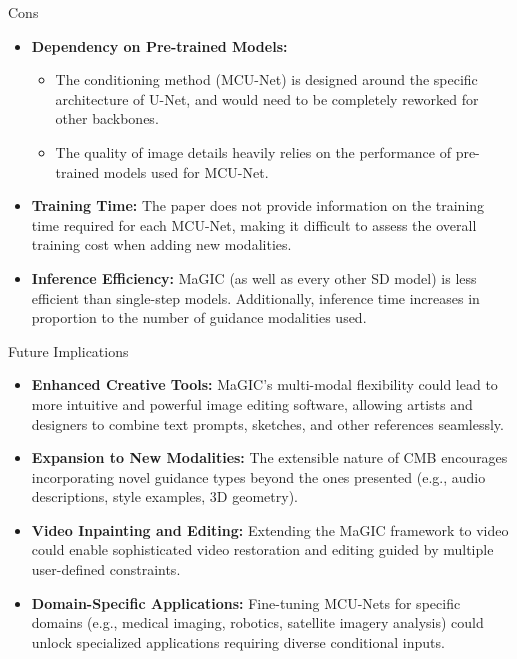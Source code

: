 \documentclass[pdf]{beamer}
\begin{document}
\begin{frame}{Cons}
    \begin{itemize}
        \item \textbf{Dependency on Pre-trained Models:}
        \begin{itemize}
            \item The conditioning method (MCU-Net) is designed around the specific architecture of U-Net, and would need to be completely reworked for other backbones.
            \item The quality of image details heavily relies on the performance of pre-trained models used for MCU-Net.
        \end{itemize}
        \item \textbf{Training Time:} The paper does not provide information on the training time required for each MCU-Net, making it difficult to assess the overall training cost when adding new modalities.
        \item \textbf{Inference Efficiency:} MaGIC (as well as every other SD model) is less efficient than single-step models. Additionally, inference time increases in proportion to the number of guidance modalities used.
    \end{itemize}
\end{frame}

\begin{frame}{Future Implications}
    \begin{itemize}
        \item \textbf{Enhanced Creative Tools:} MaGIC's multi-modal flexibility could lead to more intuitive and powerful image editing software, allowing artists and designers to combine text prompts, sketches, and other references seamlessly.

        \item \textbf{Expansion to New Modalities:} The extensible nature of CMB encourages incorporating novel guidance types beyond the ones presented (e.g., audio descriptions, style examples, 3D geometry).

        \item \textbf{Video Inpainting and Editing:} Extending the MaGIC framework to video could enable sophisticated video restoration and editing guided by multiple user-defined constraints.

        \item \textbf{Domain-Specific Applications:} Fine-tuning MCU-Nets for specific domains (e.g., medical imaging, robotics, satellite imagery analysis) could unlock specialized applications requiring diverse conditional inputs.
    \end{itemize}
\end{frame}
\end{document}
